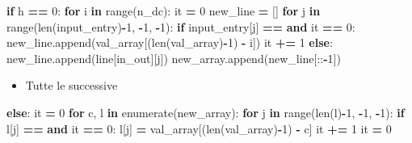 \documentclass[
]{book}
\newenvironment{Shaded}{\begin{snugshade}}{\end{snugshade}}
\newcommand{\BuiltInTok}[1]{#1}
\newcommand{\ControlFlowTok}[1]{\textcolor[rgb]{0.13,0.29,0.53}{\textbf{#1}}}
\newcommand{\DecValTok}[1]{\textcolor[rgb]{0.00,0.00,0.81}{#1}}
\newcommand{\KeywordTok}[1]{\textcolor[rgb]{0.13,0.29,0.53}{\textbf{#1}}}
\newcommand{\NormalTok}[1]{#1}
\newcommand{\OperatorTok}[1]{\textcolor[rgb]{0.81,0.36,0.00}{\textbf{#1}}}
\newcommand{\StringTok}[1]{\textcolor[rgb]{0.31,0.60,0.02}{#1}}
\providecommand{\tightlist}{%
  \setlength{\itemsep}{0pt}\setlength{\parskip}{0pt}}
\begin{document}
\begin{Shaded}
\begin{Highlighting}[]
\ControlFlowTok{if}\NormalTok{ h }\OperatorTok{==} \DecValTok{0}\NormalTok{:}
  \ControlFlowTok{for}\NormalTok{ i }\KeywordTok{in} \BuiltInTok{range}\NormalTok{(n\_dc):}
\NormalTok{    it }\OperatorTok{=} \DecValTok{0}
\NormalTok{    new\_line }\OperatorTok{=}\NormalTok{ []}
    \ControlFlowTok{for}\NormalTok{ j }\KeywordTok{in} \BuiltInTok{range}\NormalTok{(}\BuiltInTok{len}\NormalTok{(input\_entry)}\OperatorTok{{-}}\DecValTok{1}\NormalTok{, }\OperatorTok{{-}}\DecValTok{1}\NormalTok{, }\OperatorTok{{-}}\DecValTok{1}\NormalTok{):}
      \ControlFlowTok{if}\NormalTok{ input\_entry[j] }\OperatorTok{==} \StringTok{\textquotesingle{}{-}\textquotesingle{}} \KeywordTok{and}\NormalTok{ it }\OperatorTok{==} \DecValTok{0}\NormalTok{:}
\NormalTok{        new\_line.append(val\_array[(}\BuiltInTok{len}\NormalTok{(val\_array)}\OperatorTok{{-}}\DecValTok{1}\NormalTok{) }\OperatorTok{{-}}\NormalTok{ i])}
\NormalTok{        it }\OperatorTok{+=} \DecValTok{1}
      \ControlFlowTok{else}\NormalTok{:}
\NormalTok{        new\_line.append(line[in\_out][j])}
\NormalTok{    new\_array.append(new\_line[::}\OperatorTok{{-}}\DecValTok{1}\NormalTok{])}
\end{Highlighting}
\end{Shaded}

\begin{itemize}
\tightlist
\item
  Tutte le successive
\end{itemize}

\begin{Shaded}
\begin{Highlighting}[]
\ControlFlowTok{else}\NormalTok{:}
\NormalTok{  it }\OperatorTok{=} \DecValTok{0}
  \ControlFlowTok{for}\NormalTok{ c, l }\KeywordTok{in} \BuiltInTok{enumerate}\NormalTok{(new\_array):}
    \ControlFlowTok{for}\NormalTok{ j }\KeywordTok{in} \BuiltInTok{range}\NormalTok{(}\BuiltInTok{len}\NormalTok{(l)}\OperatorTok{{-}}\DecValTok{1}\NormalTok{, }\OperatorTok{{-}}\DecValTok{1}\NormalTok{, }\OperatorTok{{-}}\DecValTok{1}\NormalTok{):}
      \ControlFlowTok{if}\NormalTok{ l[j] }\OperatorTok{==} \StringTok{\textquotesingle{}{-}\textquotesingle{}} \KeywordTok{and}\NormalTok{ it }\OperatorTok{==} \DecValTok{0}\NormalTok{:}
\NormalTok{        l[j] }\OperatorTok{=}\NormalTok{ val\_array[(}\BuiltInTok{len}\NormalTok{(val\_array)}\OperatorTok{{-}}\DecValTok{1}\NormalTok{) }\OperatorTok{{-}}\NormalTok{ c]}
\NormalTok{        it }\OperatorTok{+=} \DecValTok{1}
\NormalTok{    it }\OperatorTok{=} \DecValTok{0}
\end{Highlighting}
\end{Shaded}
\end{document}
